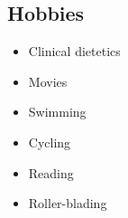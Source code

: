\documentclass[]{article}
\providecommand{\tightlist}{%
  \setlength{\itemsep}{0pt}\setlength{\parskip}{0pt}}
\begin{document}
\subsection{Hobbies}\label{hobbies}

\begin{itemize}
\tightlist
\item
  Clinical dietetics
\item
  Movies
\item
  Swimming
\item
  Cycling
\item
  Reading
\item
  Roller-blading
\end{itemize}
\end{document}
